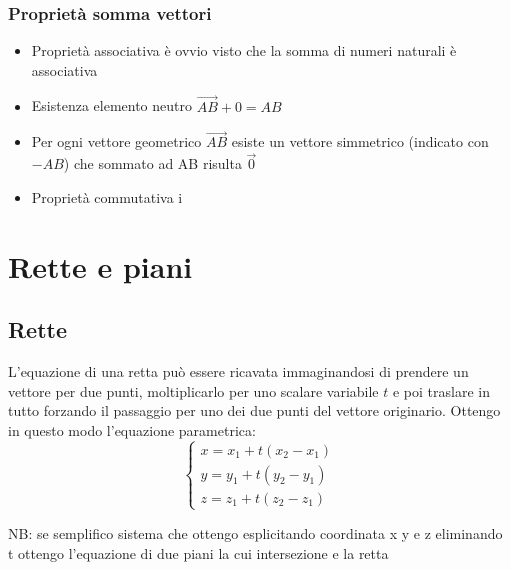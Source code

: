 \subsubsection*{Proprietà somma vettori}
\label{sub:proprietàsommavettori}
\begin{itemize}
	\item Proprietà associativa \rarr è ovvio visto che la somma di numeri naturali è associativa
	\item Esistenza elemento neutro $\vec{AB} + 0 = AB$
	\item Per ogni vettore geometrico $\vec{{AB}}$ esiste un vettore simmetrico (indicato con $-AB$) che sommato ad AB risulta $\vec{0}$
	\item Proprietà commutativa
	      i
\end{itemize}

\begin{center}
\end{center}

\section{Rette e piani}
\subsection{Rette}
L'equazione di una retta può essere ricavata immaginandosi di prendere un vettore per due punti, moltiplicarlo per uno scalare variabile  $t$ e poi traslare in tutto forzando il passaggio per uno dei due punti del vettore originario. Ottengo in questo modo l'equazione parametrica:
\[
	\begin{cases}
		x = x_1 + t\left( x_2-x_1 \right) \\
		y = y_1 + t\left( y_2-y_1 \right) \\
		z = z_1 + t\left( z_2-z_1 \right)
	\end{cases}
\]
\begin{tcolorbox}
	NB: se semplifico sistema che ottengo esplicitando coordinata x y e z eliminando t ottengo l'equazione di due piani la cui intersezione e la retta
\end{tcolorbox}


